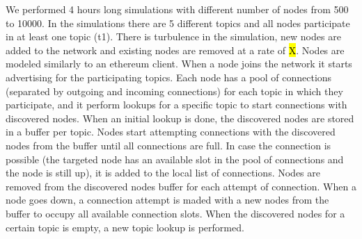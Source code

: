 We performed 4 hours long simulations with different number of nodes from 500 to 10000.
In the simulations there are 5 different topics and all nodes participate in at least one topic (t1).
There is turbulence in the simulation,  \ie new nodes are added to the network and existing nodes are removed at a rate of \hl{X}.
Nodes are modeled similarly to an ethereum client. 
When a node joins the network it starts advertising for the participating topics.
Each node has a pool of connections (separated by outgoing and incoming connections) for each topic in which they participate, and it perform lookups
for a specific topic to start connections with discovered nodes.
When an initial lookup is done, the discovered nodes are stored in a buffer per topic.
Nodes start attempting connections with the discovered nodes from the buffer until all connections 
are full.
In case the connection is possible (the targeted node has an available slot in the pool of connections and the node is still up), it is added 
to the local list of connections.
Nodes are removed from the discovered nodes buffer for each attempt of connection.
When a node goes down, a connection attempt is maded with a new nodes from the buffer to occupy all available connection slots.
When the discovered nodes for a certain topic is empty, a new topic lookup is performed.





